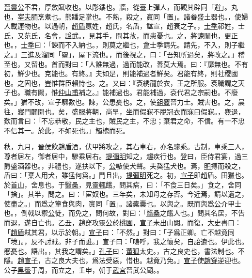 \documentclass{article}
\newcommand{\tsu}{\small\kaishu\color{brown}}
\begin{document}
\noindent{\tsu 宣公二年}

\uline{晉靈公}不君，厚斂{\tsu 賦收也。}以彫{\tsu 鏤也。}牆，從臺上彈人，而觀其辟{\tsu 同「避」。}丸也，\uline{宰夫}胹{\tsu 烹煮也。}熊蹯{\tsu 足掌也。}不熟，殺之，寘{\tsu 同「置」。}諸畚{\tsu 盛土器也。}，使婦人載{\tsu 運物也。}以過朝，\uline{趙盾}{\tsu 嬴姓，趙氏，名盾，諡宣，趙衰之子。}，\uline{士季}{\tsu 祁姓，士氏，又范氏，名會，諡武。}，見其手，問其故，而患{\tsu 憂也。}之，將諫{\tsu 閒也，更正也。}，\uline{士季}曰：「諫而不入{\tsu 納也。}，則莫之繼也，\uline{會}{\tsu 士季請先。}請先，不入，則子繼之。」三進及溜{\tsu 同「霤」，屋下流也。}，而後視之，曰：「吾知所過矣，將改之。」稽{\tsu 至也，又留也。}首而對曰：「人誰無過，過而能改，善莫大焉。曰：『靡{\tsu 無也。}不有初，鮮{\tsu 少也。}克{\tsu 能也。}有終。』夫如是，則能補過者鮮矣。君能有終，則社稷{\tsu 國也。}之固也，豈惟群臣賴{\tsu 恃也。}之。又曰：『袞{\tsu 綉龍於衣，王之所服。袞職謂之天子也。}職有闕，惟\uline{仲山甫}補之。』能補過也。君能補過，袞{\tsu 代君之宗嗣也。}不廢矣。」猶不改，宣子驟{\tsu 數也。}諫，公患{\tsu 憂也。}之，使\uline{鉏麑}{\tsu 晉力士。}賊{\tsu 害也。}之，晨往，寢門闢{\tsu 開也。}矣，盛服將朝，尚早，坐而假寐{\tsu 不脫冠衣而寐曰假寐。}，\uline{麑}退，歎而言曰：「不忘恭敬，民之主也，賊民之主，不忠；棄君之命，不信。有一{\tsu 不忠不信其一。}於此，不如死也。」觸槐而死。

秋，九月，\uline{晉侯}飲\uline{趙盾}酒，伏甲將攻之，其右{\tsu 車右，亦名驂乘。古制，車乘三人，尊者居左，御者居中，驂乘居右。}\uline{提彌明}知之，趨{\tsu 疾行也。}登曰，臣侍君宴，過三爵{\tsu 盛酒器也。}，非禮也，遂扶以下，\uline{公}嗾{\tsu 使犬聲。}夫獒{\tsu 猛犬也。}焉，\uline{明}搏而殺之，盾曰：「棄人用犬，雖猛何爲。」鬥且出，\uline{提彌明}死之。初，\uline{宣子}{\tsu 即趙盾。}田{\tsu 獵也。}於\uline{首山}，舍{\tsu 息也。}于\uline{翳桑}，見\uline{靈輒}餓，問其病，曰：「不食三日矣。」食之，舍{\tsu 同「捨」。}其半，問之。曰：「宦{\tsu 奴也。}三年矣，未知母之存否。今近焉，請以遺之，使盡之。」而爲之簞食與肉，寘{\tsu 同「置」。}諸橐{\tsu 囊也。}以與之。既而與爲\uline{公}介{\tsu 甲士也。}，倒戟以禦\uline{公}徒，而免之，問何故，對曰：「\uline{翳桑}之餓人也。」問其名居，不告而退，遂自亡也。乙丑，\uline{趙穿}攻\uline{靈公}於\uline{桃園}，\uline{宣子}未出山{\tsu 闕。}而復，\uline{大史}書曰：「\uline{趙盾}弒其君，以示於朝。」\uline{宣子}曰：「不然。」對曰：「子爲正卿。亡不越竟{\tsu 同「境」。}，反不討賊。非子而誰。」宣子曰：「嗚呼，我之懷矣，自詒{\tsu 遺也。}伊{\tsu 此也。}慼{\tsu 憂也。}{\tsu 語出。}，其我之謂矣。」\uline{孔子}曰：\uline{董狐}{\tsu 太史。}，古之良史也，書法{\tsu 制也。}不隱。\uline{趙宣子}，古之良大夫也，爲法受惡，惜也。越竟乃免。」\uline{宣子}使\uline{趙穿}逆{\tsu 迎也。}公子\uline{黑臀}于周，而立之，壬申，朝于\uline{武宮}{\tsu 晉武公廟。}。
\end{document}
